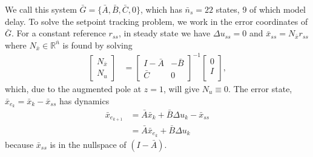 \documentclass[journal,twocolumn,twoside]{IEEEtran}
\newcommand{\du}{\ensuremath{\Delta u }\xspace}
\newcommand{\Gd}{\ensuremath{\bar G }\xspace}
\newcommand{\Ad}{\ensuremath{\bar A }\xspace}
\newcommand{\Bd}{\ensuremath{\bar B }\xspace}
\newcommand{\Cd}{\ensuremath{\bar C }\xspace}
\newcommand{\xd}{\ensuremath{\bar x }\xspace}
\newcommand{\xdss}{\ensuremath{\bar x_{ss} }\xspace}
\newcommand{\dd}{\ensuremath{\Delta }\xspace}
\begin{document}
We call this system \(\Gd = \{\Ad, \Bd, \Cd, 0\}\), which has \({\bar{n}_s=22}\) states, 9 of which model delay.
To solve the setpoint tracking problem, we work in the error
coordinates of \(\Gd\).
For a constant reference \(r_{ss}\), in steady state we have \({\du_{ss}=0}\) and \({\xdss =N_{\xd}r_{ss}}\) where \({N_{\xd}\in\mathds{R}^{\bar{n}}}\) is found by solving
\begin{align}
  \begin{bmatrix}N_{\xd} \\ N_u\end{bmatrix} &=
\begin{bmatrix}I-\Ad & -\Bd\\\Cd & 0\end{bmatrix}^{-1}\begin{bmatrix}0\\ I\\\end{bmatrix}\label{eqn:nxnu},
\end{align}
which, due to the augmented pole at $z=1$, will give \(N_u\equiv 0\). 
The error state, \({\xd_{e_k}=\xd_k - \xdss}\) has dynamics
\begin{align}
  \xd_{e_{k+1}} & = \Ad\xd_k + \Bd\dd u_k - \xdss \nonumber\\
            & = \Ad \xd_{e_k}   + \Bd \dd u_k\nonumber
\end{align}
              because $\xdss$ is in the nullspace of $(I - \Ad)$.
              
\end{document}
